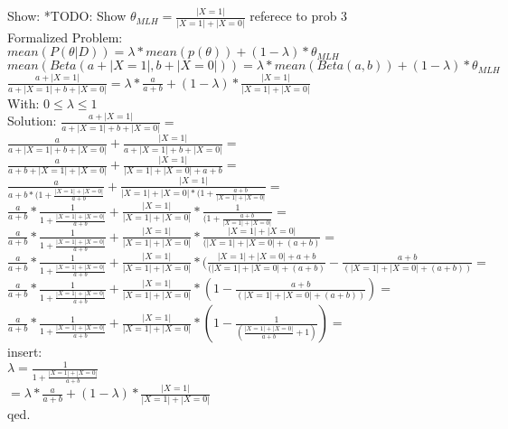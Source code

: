 Show:
*TODO: Show $\theta_{MLH} = \frac{|X=1|}{|X=1|+|X=0|} $ referece to prob 3 \\

Formalized Problem: \\
$mean(P(\theta | D )) = \lambda * mean(p(\theta)) + (1-\lambda ) * \theta_{MLH} $ \\
$mean(Beta(a +|X=1|,b +|X=0| )) = \lambda * mean(Beta(a,b)) + (1-\lambda ) * \theta_{MLH} $ \\
$\frac{a+|X=1|}{a+|X=1|+b+|X=0|} = \lambda * \frac{a}{a+b} + (1-\lambda ) * \frac{|X=1|}{|X=1|+|X=0|} $ \\

With: $0\le \lambda \le 1$ \\

Solution:
$\frac{a+|X=1|}{a+|X=1|+b+|X=0|} = $ \\
$\frac{a}{a+|X=1|+b+|X=0|} + \frac{|X=1|}{a+|X=1|+b+|X=0|} = $ \\
$\frac{a}{a+b+|X=1|+|X=0|} + \frac{|X=1|}{|X=1|+|X=0|+a+b} = $ \\
$\frac{a}{a+b*(1+\frac{|X=1|+|X=0|}{a+b}} + \frac{|X=1|}{|X=1|+|X=0|*(1+\frac{a+b}{|X=1|+|X=0|}} = $ \\
$\frac{a}{a+b}*\frac{1}{1+\frac{|X=1|+|X=0|}{a+b}} + \frac{|X=1|}{|X=1|+|X=0|}*\frac{1}{(1+\frac{a+b}{|X=1|+|X=0|}} =$ \\
$\frac{a}{a+b}*\frac{1}{1+\frac{|X=1|+|X=0|}{a+b}} + \frac{|X=1|}{|X=1|+|X=0|}*\frac{|X=1|+|X=0|}{(|X=1|+|X=0|+(a+b)} =$ \\
$\frac{a}{a+b}*\frac{1}{1+\frac{|X=1|+|X=0|}{a+b}} + \frac{|X=1|}{|X=1|+|X=0|}*(\frac{|X=1|+|X=0|+a+b}{(|X=1|+|X=0|+(a+b)} -\frac{a+b}{(|X=1|+|X=0|+(a+b))} =$ \\
$\frac{a}{a+b}*\frac{1}{1+\frac{|X=1|+|X=0|}{a+b}} + \frac{|X=1|}{|X=1|+|X=0|}*(1-\frac{a+b}{(|X=1|+|X=0|+(a+b))}) =$ \\
$\frac{a}{a+b}*\frac{1}{1+\frac{|X=1|+|X=0|}{a+b}} + \frac{|X=1|}{|X=1|+|X=0|}*(1-\frac{1}{(\frac{|X=1|+|X=0|}{a+b}+1)}) =$ \\
insert: \\
$\lambda = \frac{1}{1+\frac{|X=1|+|X=0|}{a+b}}$ \\
$= \lambda * \frac{a}{a+b} + (1-\lambda ) * \frac{|X=1|}{|X=1|+|X=0|} $ \\

qed.
